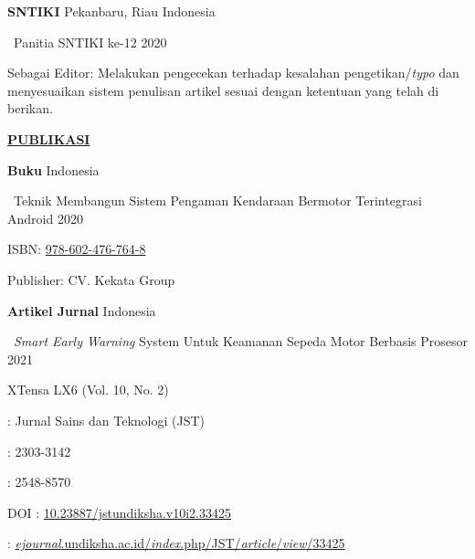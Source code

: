 \documentclass{scrbook}
\begin{document}
	\uppercase{\textbf{SNTIKI}}	Pekanbaru, Riau Indonesia

{\textbullet}~Panitia SNTIKI ke-12 2020

Sebagai Editor\uppercase{: }Melakukan pengecekan terhadap kesalahan pengetikan/\textit{typo} dan menyesuaikan sistem penulisan artikel sesuai dengan ketentuan yang telah di berikan.

\uppercase{\textbf{\uline{Publikasi}}} 

\textbf{Buku} Indonesia

{\textbullet}~Teknik Membangun Sistem Pengaman Kendaraan Bermotor Terintegrasi Android 2020

ISBN: \href{https://isbn.perpusnas.go.id/Account/SearchBuku?searchTxt=978-602-476-764-8&searchCat=ISBN}{978-602-476-764-8}

Publisher: CV. Kekata Group

\textbf{Artikel Jurnal} Indonesia
\begin{description}[JURNAL]
\item[]{\textbullet}~\textit{Smart Early Warning} System Untuk Keamanan Sepeda Motor Berbasis Prosesor  2021

XTensa LX6 (Vol. 10, No. 2)
\item[JURNAL]: Jurnal Sains dan Teknologi (JST)
\begin{description}[P-ISSN]
\item[P-ISSN]: 2303-3142
\item[E-ISSN]: 2548-8570
\end{description}
		DOI	: \href{https://doi.org/10.23887/jstundiksha.v10i2.33425}{10.23887/jstundiksha.v10i2.33425}
\item[URL]: \href{https://ejournal.undiksha.ac.id/index.php/JST/article/view/33425}{\textit{ejournal}.undiksha.ac.id/\textit{index}.php/JST/\textit{article}/\textit{view}/33425} 
\end{description}
\end{document}
